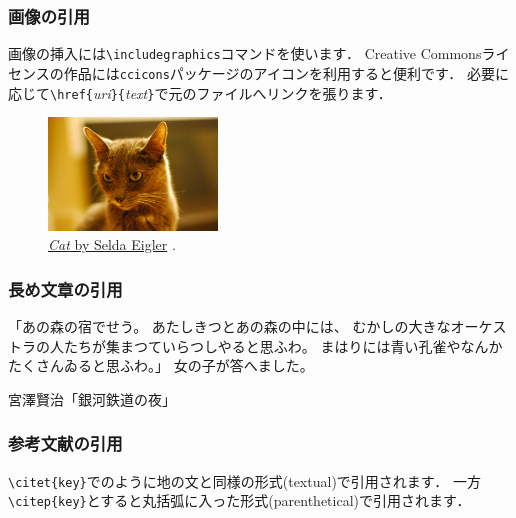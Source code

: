 \documentclass[12pt]{beamer}
\newenvironment{quoteblock}{%
    \def\FrameCommand{%
        {\color{sLightGray}{\vrule width 3pt}}%
        \hspace{10pt}
    }%
    \MakeFramed {\advance\hsize-\width \FrameRestore}}%
{\endMakeFramed}
\begin{document}
\begin{frame}
    \frametitle{画像の引用}
    画像の挿入には\texttt{\textbackslash includegraphics}コマンドを使います．
    Creative Commonsライセンスの作品には\texttt{ccicons}パッケージのアイコンを利用すると便利です．
    必要に応じて\texttt{\textbackslash href\{}\emph{uri}\texttt{\}\{}\emph{text}\texttt{\}}で元のファイルへリンクを張ります．

    \bigskip

    \begin{figure}[b]
        \includegraphics[width=0.4\textwidth]{cat.jpg}
        \caption{\href{https://www.flickr.com/photos/selda_eigler/8687127864/in/photolist-eeDNsC-qWFs4R-7CNDjJ-9c8DxY-eeDNhC-UCZ63T-dJNGUc-e5Nk39-988EVA-kUgwo-owDcVP-jQGjjt-5zkGTy-7WRCUo-b91XbZ-Mj8Ku-5pzwSA-9Bct2H-7CNHMY-7CJJMB-8MyEYn-9x45Mp-7JTq8M-ZrpGJ9-8fRht4-4SxVZT-5pzwjJ-ZsPJjL-aE44GL-dF6uWD-kqbHgM-5F373J-ZsQrVG-qyD7E9-ajyDPL-4WDvTp-KbDSc-5kCxD9-4MdeUo-pgDQcG-pPWrXD-662AFD-oTnC8k-apYceQ-nJSaaY-7CJLZv-7CJJMn-7CNFsU-XNMWkw-ccdtT9}{\emph{Cat} by Selda Eigler} \ccby.}
    \end{figure}

\end{frame}

\begin{frame}
    \frametitle{長め文章の引用}
    \begin{quoteblock}
        「あの森の宿でせう。
        あたしきつとあの森の中には、
        むかしの大きなオーケストラの人たちが集まつていらつしやると思ふわ。
        まはりには青い孔雀やなんかたくさんゐると思ふわ。」
        女の子が答へました。

        \hfill 宮澤賢治「銀河鉄道の夜」
    \end{quoteblock}
\end{frame}

\begin{frame}
\frametitle{参考文献の引用}
\texttt{{\textbackslash}citet\{key\}}で\citet{demo}のように地の文と同様の形式(textual)で引用されます．
一方\texttt{{\textbackslash}citep\{key\}}とすると丸括弧に入った形式(parenthetical)で引用されます\citep{demo}．
\end{frame}
\end{document}
